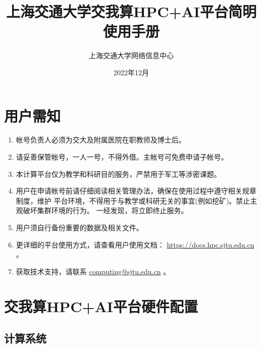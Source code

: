 \documentclass[cn, 12pt, hang, black, chinese]{elegantbook}
\title{上海交通大学交我算HPC+AI平台简明使用手册}
\author{上海交通大学网络信息中心}
\date{2022年12月}
\begin{document}
\maketitle
\frontmatter

\chapter*{用户需知}


\begin{enumerate}
\item 帐号负责人必须为交大及附属医院在职教师及博士后。
\item 请妥善保管帐号，一人一号，不得外借。主帐号可免费申请子帐号。
\item 本计算平台仅为教学和科研目的服务，严禁用于军工等涉密课题。
\item 用户在申请帐号前请仔细阅读相关管理办法，确保在使用过程中遵守相关规章制度，维护 平台环境，不得用于与教学或科研无关的事宜(例如挖矿)。禁止主观破坏集群环境的行为。 一经发现，将立即终止服务。
\item 用户须自行备份重要的数据及相关文件。
\item 更详细的平台使用方式，请查看用户使用文档： \href{https://docs.hpc.sjtu.edu.cn}{https://docs.hpc.sjtu.edu.cn} 。
\item 获取技术支持，请联系 \href{mailto:computing@sjtu.edu.cn}{computing@sjtu.edu.cn} 。
\end{enumerate}

\tableofcontents

\mainmatter

\chapter{交我算HPC+AI平台硬件配置}

\section{计算系统}
\end{document}
